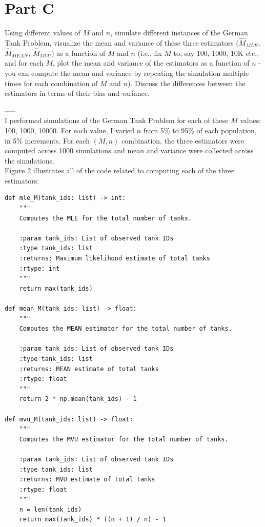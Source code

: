 \section{Part C}
Using different values of $M$ and $n$, simulate different instances of the German Tank Problem, visualize the mean and variance of these three estimators ($\hat{M}_{MLE}$, $\hat{M}_{MEAN}$,
$\hat{M}_{MVU}$) as a function of $M$ and $n$ (i.e., fix $M$ to, say 100, 1000, 10K etc., and
for each $M$, plot the mean and variance of the estimators as a function of $n$ - you can compute the mean and variance by repeating the
simulation multiple times for each combination of $M$ and $n$). Discuss the differences between the estimators in terms of their bias and variance.

-----\\

I performed simulations of the German Tank Problem for each of these $ M $ values: 100, 1000, 10000. For each value, I varied $ n $ from 5\% to 95\% of each population, in 5\% increments. For each $ (M, n) $ combination, the three estimators were computed across 1000 simulations and mean and variance were collected across the simulations.\\

Figure 2 illustrates all of the code related to computing each of the three estimators:

\begin{verbatim}
def mle_M(tank_ids: list) -> int:
    """
    Computes the MLE for the total number of tanks.
    
    :param tank_ids: List of observed tank IDs
    :type tank_ids: list
    :returns: Maximum likelihood estimate of total tanks
    :rtype: int
    """
    return max(tank_ids)

def mean_M(tank_ids: list) -> float:
    """
    Computes the MEAN estimator for the total number of tanks.
    
    :param tank_ids: List of observed tank IDs
    :type tank_ids: list
    :returns: MEAN estimate of total tanks
    :rtype: float
    """
    return 2 * np.mean(tank_ids) - 1

def mvu_M(tank_ids: list) -> float:
    """
    Computes the MVU estimator for the total number of tanks.
    
    :param tank_ids: List of observed tank IDs
    :type tank_ids: list
    :returns: MVU estimate of total tanks
    :rtype: float
    """
    n = len(tank_ids)
    return max(tank_ids) * ((n + 1) / n) - 1
\end{verbatim}

